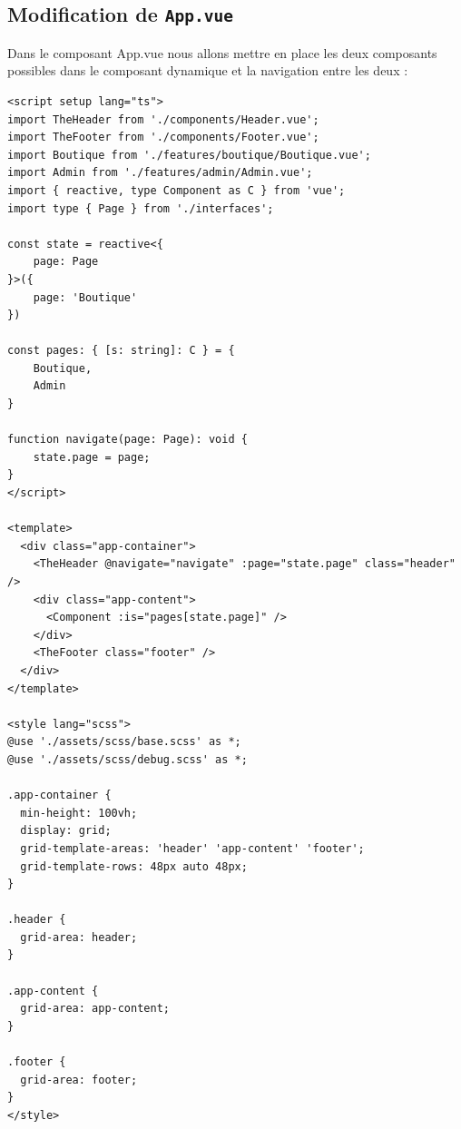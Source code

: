 \subsection{Modification de {\tt App.vue}}
Dans le composant {\color{monOrange}App.vue} nous allons mettre en place les deux composants possibles dans le composant dynamique et la navigation entre les deux :
\begin{verbatim}
<script setup lang="ts">
import TheHeader from './components/Header.vue';
import TheFooter from './components/Footer.vue';
import Boutique from './features/boutique/Boutique.vue';
import Admin from './features/admin/Admin.vue';
import { reactive, type Component as C } from 'vue';
import type { Page } from './interfaces';

const state = reactive<{
    page: Page
}>({
    page: 'Boutique'
})

const pages: { [s: string]: C } = {
    Boutique,
    Admin
}

function navigate(page: Page): void {
    state.page = page;
}
</script>

<template>
  <div class="app-container">
    <TheHeader @navigate="navigate" :page="state.page" class="header" />
    <div class="app-content">
      <Component :is="pages[state.page]" />
    </div>
    <TheFooter class="footer" />
  </div>
</template>

<style lang="scss">
@use './assets/scss/base.scss' as *;
@use './assets/scss/debug.scss' as *;

.app-container {
  min-height: 100vh;
  display: grid;
  grid-template-areas: 'header' 'app-content' 'footer';
  grid-template-rows: 48px auto 48px;
}

.header {
  grid-area: header;
}

.app-content {
  grid-area: app-content;
}

.footer {
  grid-area: footer;
}
</style>
\end{verbatim}
